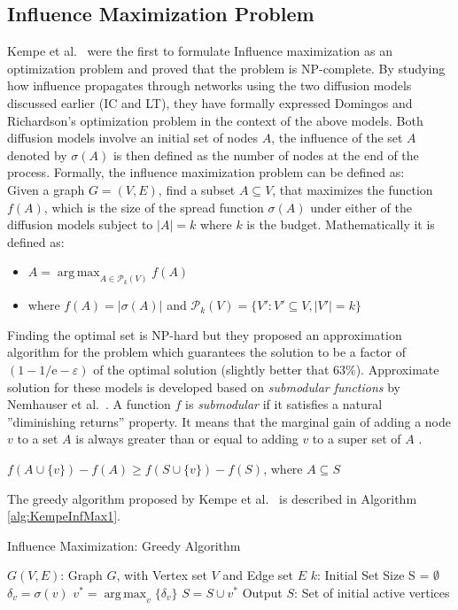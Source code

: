 \documentclass[english]{tktltiki}
\DeclareMathOperator*{\argmax}{arg\,max}
\begin{document}
\subsection{Influence Maximization Problem}
Kempe et al.\ \cite{kempe03} were the first to formulate Influence maximization as an optimization problem and proved that the problem is NP-complete. By studying how influence propagates through networks using the two diffusion models discussed earlier (IC and LT), they have formally expressed Domingos and Richardson's \cite{domingo01} optimization problem in the context of the above models. Both diffusion models involve an initial set of nodes $A$, the influence of the set $A$ denoted by $\sigma (A)$ is then defined as the number of nodes at the end of the process. Formally, the influence maximization problem can be defined as: \\
Given a graph $G=(V,E)$, find a subset $A\subseteq V$, that maximizes the function $f(A)$, which is the size of the spread function $\sigma(A)$ under either of the diffusion models subject to $|A| = k$ where $k$ is the budget. Mathematically it is defined as:
\begin{center}
\begin{itemize}
\item $A =  \argmax_{A \in \mathcal P_k(V) } f(A)$
\item where $f(A) = |\sigma(A)|$ and $\mathcal P_k(V) = \{V':V' \subseteq V, |V'|=k\}$
\end{itemize}
\end{center}
Finding the optimal set is NP-hard but they proposed an approximation algorithm for the problem which guarantees the solution to be a factor of $(1 - 1/ \mathrm{e} - \varepsilon)$ of the optimal solution (slightly better that 63\%). 
Approximate solution for these models is developed based on \textit{submodular functions} by Nemhauser et al.\ \cite{nemhauser78}.
A function $f$ is \textit{submodular} if it satisfies a natural ''diminishing returns'' property. It means that the marginal gain of adding a node $v$ to a set $A$ is always greater than or equal to adding $v$ to a super set of $A$ . 
\begin{center}
$f(A \cup \{v\}) - f(A) \geq f(S \cup \{v\}) - f(S)$, where $A \subseteq S$
\end{center}
The greedy algorithm proposed by Kempe et al.\ \cite{kempe03} is described in Algorithm \ref{alg:KempeInfMax1}. 
\begin{algorithm}[ht!]
\caption{Influence Maximization: Greedy Algorithm \cite{kempe03}}
\label{alg:KempeInfMax1}
\begin{algorithmic}
\Require $G(V,E)$: Graph $G$, with Vertex set $V$ and Edge set $E$
\Require $k$: Initial Set Size
\State S = $\emptyset$
		\State $\delta_v = \sigma(v)$
	\EndFor
	\State $v^* = \argmax_v \{\delta_v\}$
	\State $S = S \cup v^*$
\EndFor
\State Output $S$: Set of initial active vertices
\end{algorithmic}
\end{algorithm}
\end{document}
